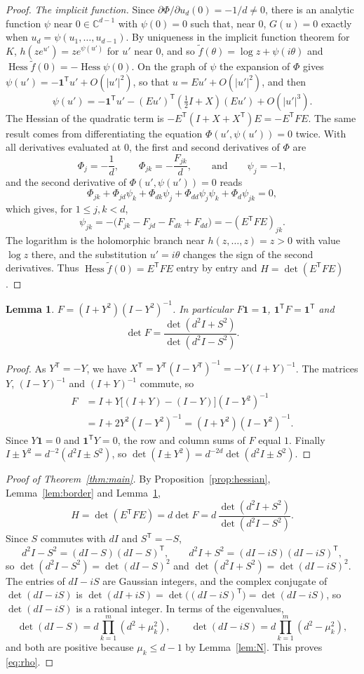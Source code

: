 \documentclass[11pt,a4paper,reqno]{amsart}
\newtheorem{lemma}[theorem]{Lemma}
\theoremstyle{remark}
\numberwithin{equation}{section}
\newcommand{\one}{\mathbf{1}}
\newcommand{\T}{\mathsf{T}}
\newcommand{\Hess}{\operatorname{Hess}}
\newcommand{\C}{\mathbb{C}}
\begin{document}
\begin{proof}
\emph{The implicit function.} Since $\partial\Phi/\partial u_d(0)=-1/d\ne0$, there is an analytic function $\psi$ near $0\in\C^{d-1}$ with $\psi(0)=0$ such that, near $0$, $G(u)=0$ exactly when $u_d=\psi(u_1,\dots,u_{d-1})$. By uniqueness in the implicit function theorem for $K$, $h(ze^{u'})=ze^{\psi(u')}$ for $u'$ near $0$, and so $\tilde f(\theta)=\log z+\psi(i\theta)$ and $\Hess\tilde f(0)=-\Hess\psi(0)$. On the graph of $\psi$ the expansion of $\Phi$ gives $\psi(u')=-\one^\T u'+O(|u'|^2)$, so that $u=Eu'+O(|u'|^2)$, and then
\[
\psi(u')=-\one^\T u'-(Eu')^\T(\tfrac12I+X)(Eu')+O(|u'|^3).
\]
The Hessian of the quadratic term is $-E^\T(I+X+X^\T)E=-E^\T FE$. The same result comes from differentiating the equation $\Phi(u',\psi(u'))=0$ twice. With all derivatives evaluated at $0$, the first and second derivatives of $\Phi$ are
\[
\Phi_j=-\frac1d,\qquad \Phi_{jk}=-\frac{F_{jk}}d,\qquad\text{and}\qquad \psi_j=-1,
\]
and the second derivative of $\Phi(u',\psi(u'))=0$ reads
\[
\Phi_{jk}+\Phi_{jd}\psi_k+\Phi_{dk}\psi_j+\Phi_{dd}\psi_j\psi_k+\Phi_d\psi_{jk}=0,
\]
which gives, for $1\le j,k<d$,
\[
\psi_{jk}=-\bigl(F_{jk}-F_{jd}-F_{dk}+F_{dd}\bigr)=-(E^\T FE)_{jk}.
\]
The logarithm is the holomorphic branch near $h(z,\dots,z)=z>0$ with value $\log z$ there, and the substitution $u'=i\theta$ changes the sign of the second derivatives. Thus $\Hess\tilde f(0)=E^\T FE$ entry by entry and $H=\det(E^\T FE)$.
\end{proof}

\begin{lemma}\label{lem:F}
$F=(I+Y^2)(I-Y^2)^{-1}$. In particular $F\one=\one$, $\one^\T F=\one^\T$ and
\[
\det F=\frac{\det(d^2I+S^2)}{\det(d^2I-S^2)}.
\]
\end{lemma}

\begin{proof}
As $Y^\T=-Y$, we have $X^\T=Y^\T(I-Y^\T)^{-1}=-Y(I+Y)^{-1}$. The matrices $Y$, $(I-Y)^{-1}$ and $(I+Y)^{-1}$ commute, so
\begin{align*}
F&=I+Y\bigl[(I+Y)-(I-Y)\bigr](I-Y^2)^{-1}\\
&=I+2Y^2(I-Y^2)^{-1}=(I+Y^2)(I-Y^2)^{-1}.
\end{align*}
Since $Y\one=0$ and $\one^\T Y=0$, the row and column sums of $F$ equal $1$. Finally $I\pm Y^2=d^{-2}(d^2I\pm S^2)$, so $\det(I\pm Y^2)=d^{-2d}\det(d^2I\pm S^2)$.
\end{proof}

\begin{proof}[Proof of Theorem~\ref{thm:main}]
By Proposition~\ref{prop:hessian}, Lemma~\ref{lem:border} and Lemma~\ref{lem:F},
\[
H=\det(E^\T FE)=d\det F=d\,\frac{\det(d^2I+S^2)}{\det(d^2I-S^2)}.
\]
Since $S$ commutes with $dI$ and $S^\T=-S$,
\[
d^2I-S^2=(dI-S)(dI-S)^\T,\qquad d^2I+S^2=(dI-iS)(dI-iS)^\T,
\]
so $\det(d^2I-S^2)=\det(dI-S)^2$ and $\det(d^2I+S^2)=\det(dI-iS)^2$. The entries of $dI-iS$ are Gaussian integers, and the complex conjugate of $\det(dI-iS)$ is $\det(dI+iS)=\det\bigl((dI-iS)^\T\bigr)=\det(dI-iS)$, so $\det(dI-iS)$ is a rational integer. In terms of the eigenvalues,
\[
\det(dI-S)=d\prod_{k=1}^m(d^2+\mu_k^2),\qquad \det(dI-iS)=d\prod_{k=1}^m(d^2-\mu_k^2),
\]
and both are positive because $\mu_k\le d-1$ by Lemma~\ref{lem:N}. This proves \eqref{eq:rho}.
\end{proof}
\end{document}

